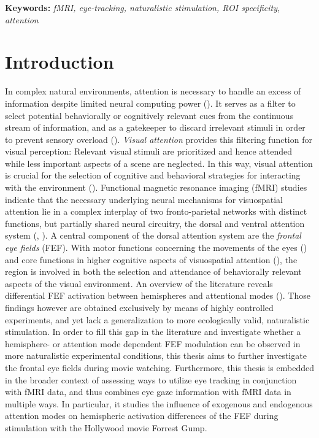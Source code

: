 \documentclass[a4paper, 12pt]{scrreprt}
\begin{document}
\bigskip

\textbf{Keywords:} \textit{fMRI, eye-tracking, naturalistic stimulation, ROI specificity, attention}



\chapter{Introduction}\label{section:intro}

In complex natural environments, attention is necessary to handle an excess of information despite limited neural computing power (\cite{carrasco2011visual}). It serves as a filter to select potential behaviorally or cognitively relevant cues from the continuous stream of information, and as a gatekeeper to discard irrelevant stimuli in order to prevent sensory overload (\cite{bellebaum2012neuropsych}). \textit{Visual attention} provides this filtering function for visual perception: Relevant visual stimuli are prioritized and hence attended while less important aspects of a scene are neglected. In this way, visual attention is crucial for the selection of cognitive and behavioral strategies for interacting with the environment (\cite{siegelbaum2000neuro}).\newline
Functional magnetic resonance imaging (fMRI) studies indicate that the necessary underlying neural mechanisms for visuospatial attention lie in a complex interplay of two fronto-parietal networks with distinct functions, but partially shared neural circuitry, the dorsal and ventral attention system (\cite{corbetta2002control}, \cite{vossel2014dorsal}). 
A central component of the dorsal attention system are the \textit{frontal eye fields} (FEF). With motor functions concerning the movements of the eyes (\cite{krauzlis2014eye}) and core functions in higher cognitive aspects of visuospatial attention (\cite{vernet2014corrigendum}), the region is involved in both the selection and attendance of behaviorally relevant aspects of the visual environment. An overview of the literature reveals differential FEF activation between hemispheres and attentional modes (\cite{siman2007bihemispheric}). Those findings however are obtained exclusively by means of highly controlled experiments, and yet lack a generalization to more ecologically valid, naturalistic stimulation. In order to fill this gap in the literature and investigate whether a hemisphere- or attention mode dependent FEF modulation can be observed in more naturalistic experimental conditions, this thesis aims to further investigate the frontal eye fields during movie watching. Furthermore, this thesis is embedded in the broader context of assessing ways to utilize eye tracking in conjunction with fMRI data, and thus combines eye gaze information with fMRI data in multiple ways. In particular, it studies the influence of exogenous and endogenous attention modes on hemispheric activation differences of the FEF during stimulation with the Hollywood movie Forrest Gump. \\
\end{document}
